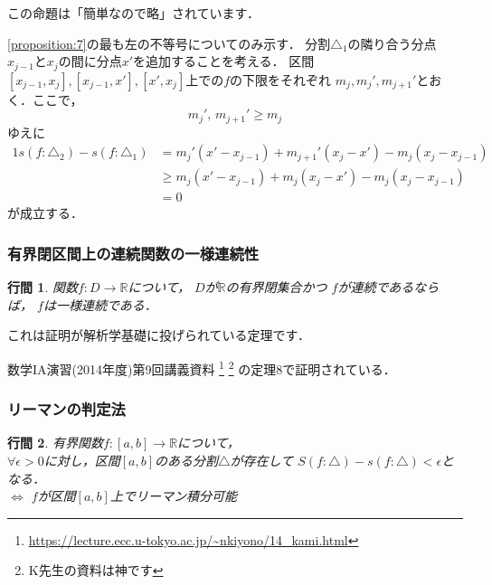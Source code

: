 \documentclass{jsarticle}
\makeatletter
\renewenvironment{proof}[1][\proofname]{\par
        \pushQED{\qed}
        \normalfont
        \topsep6\p@\@plus6\p@ \trivlist
        \item[\hskip\labelsep{\bfseries #1}\@addpunct{\bfseries}]\ignorespaces
    }{%
        \popQED\endtrivlist\@endpefalse
    }
\renewcommand{\proofname}{\underline{証明.}}
\newtheorem{proposition}{行間}
\makeatother
\begin{document}
この命題は「簡単なので略」されています．

\begin{proof}
    \cref{proposition:7}の最も左の不等号についてのみ示す．
    分割$\triangle_1$の隣り合う分点$x_{j-1}$と$x_{j}$の間に分点$x'$を追加することを考える．
    区間$[x_{j-1}, x_{j}], [x_{j-1}, x'], [x', x_j]$上での$f$の下限をそれぞれ
    $m_j, m_j', m_{j+1}'$とおく．ここで，
    \begin{equation}
        m_j',\, m_{j+1}' \geq m_j
    \end{equation}
    ゆえに
    \begin{alignat}{1}
        s(f:\triangle_2) - s(f:\triangle_1) &=
            m_j' (x' - x_{j-1}) + m_{j+1}' (x_j - x') - m_j (x_j - x_{j-1}) \\
        &\geq
            m_j (x' - x_{j-1}) + m_j (x_j - x') - m_j (x_j - x_{j-1}) \\
        &=
            0
    \end{alignat}
    が成立する．
\end{proof}

\subsubsection{有界閉区間上の連続関数の一様連続性}
\begin{screen}
    \begin{proposition}
        関数$f:D\rightarrow\mathbb{R}$について，
        $D$が$\mathbb{R}$の有界閉集合かつ
        $f$が連続であるならば，
        $f$は一様連続である．
    \end{proposition}
\end{screen}

これは証明が解析学基礎に投げられている定理です．

\begin{proof}
    数学IA演習(2014年度)第9回講義資料
    \footnote{\url{https://lecture.ecc.u-tokyo.ac.jp/~nkiyono/14_kami.html}}
    \footnote{K先生の資料は神です}
    の定理8で証明されている．
\end{proof}

\subsubsection{リーマンの判定法}
\begin{screen}
    \begin{proposition}
        \label{proposition:9}
        有界関数$f:[a,b]\rightarrow\mathbb{R}$について， \\
        $\forall \epsilon > 0$に対し，区間$[a,b]$のある分割$\triangle$が存在して
        $S(f: \triangle) - s(f: \triangle) < \epsilon$となる． \\
        \quad $\Longleftrightarrow$ $f$が区間$[a,b]$上でリーマン積分可能
    \end{proposition}
\end{screen}
\end{document}
